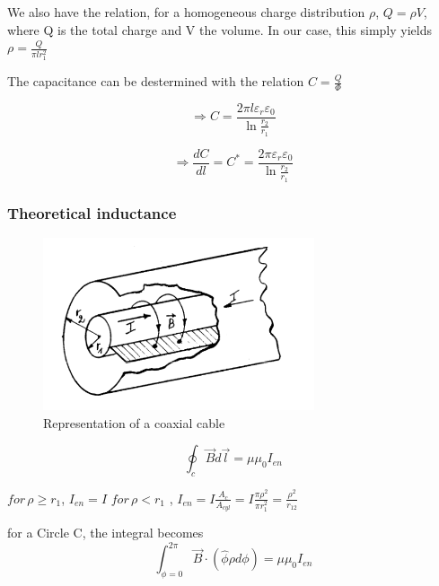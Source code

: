 \documentclass{scrartcl}
\begin{document}
    We also have the relation, for a homogeneous charge distribution $\rho$, $Q = \rho V$, where Q is the total charge and V the volume. In our case, this simply yields $\rho = \frac{Q}{\pi l r_1^2}$ 
    
    The capacitance can be destermined with the relation $C = \frac{Q}{\Phi}$
    
    \begin{equation}
        \Rightarrow C = \frac{2\pi l\varepsilon_r \varepsilon_0}{\ln{\frac{r_2}{r_1}}}
    \end{equation}
    
    \begin{equation}
        \boxed{\Rightarrow \frac{dC}{dl} = C^* = \frac{2\pi  \varepsilon_r\varepsilon_0}{\ln{\frac{r_2}{r_1}}}}
    \end{equation}

\subsubsection {Theoretical inductance}

\begin{figure}[h]
    \centering
    \includegraphics[width=8cm]{coaxial cable.PNG}
    \caption{Representation of a coaxial cable}
    \label{fig:my_label}
\end{figure}

\begin{equation}
    \oint_c {\vec{B}} d{\vec{l}} = \mu\mu_0 I_{en}
\end{equation}

\centering
$for \, \rho \geq r_1$, $I_{en} = I$ \qquad $for \, \rho < r_1$ , $I_{en}=I\frac{A_c}{A_{cyl}}=I\frac{\pi\rho^2}{\pi r_1^2}=\frac{\rho^2}{r_12}$
\flushleft



for a Circle C, the integral becomes
\begin{equation}
    \int_{\phi=0}^{2\pi}\vec{B}\cdot(\hat{\phi}\rho d\phi)=\mu\mu_0 I_{en}
\end{equation}
\end{document}

